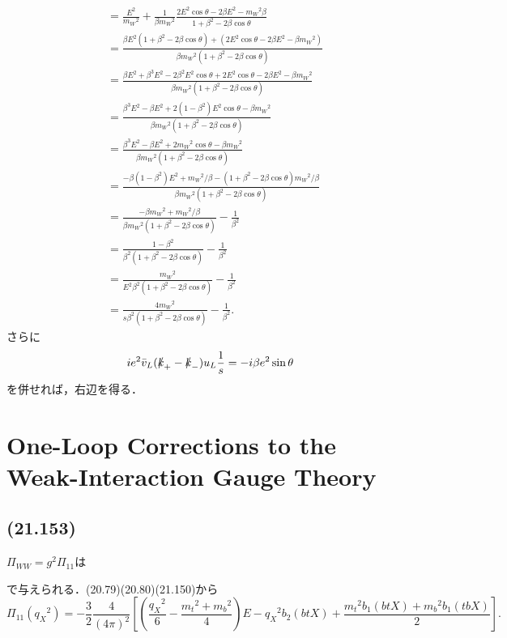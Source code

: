 \begin{align*}
  [\cdots] &= \frac{E^2}{m_W{}^2} + \frac{1}{\beta m_W{}^2} \frac{2 E^2 \cos\theta - 2 \beta E^2  - m_W{}^2 \beta}{1 + \beta^2 - 2\beta\cos\theta} \\
  &= \frac{\beta E^2(1 + \beta^2 - 2\beta\cos\theta) + (2E^2\cos\theta - 2\beta E^2 - \beta m_W{}^2)}{\beta m_W{}^2 (1 + \beta^2 - 2\beta\cos\theta)} \\
  &= \frac{\beta E^2 + \beta^3 E^2 - 2\beta^2E^2\cos\theta + 2E^2\cos\theta - 2\beta E^2 - \beta m_W{}^2}{\beta m_W{}^2 (1 + \beta^2 - 2\beta\cos\theta)} \\
  &= \frac{\beta^3 E^2 - \beta E^2  + 2(1-\beta^2)E^2\cos\theta - \beta m_W{}^2}{\beta m_W{}^2 (1 + \beta^2 - 2\beta\cos\theta)} \\
  &= \frac{\beta^3 E^2 - \beta E^2 + 2m_W{}^2\cos\theta - \beta m_W{}^2}{\beta m_W{}^2 (1 + \beta^2 - 2\beta\cos\theta)} \\
  &= \frac{-\beta(1-\beta^2) E^2 + m_W{}^2 / \beta - (1 + \beta^2 - 2\beta\cos\theta) m_W{}^2/\beta}{\beta m_W{}^2 (1 + \beta^2 - 2\beta\cos\theta)} \\
  &= \frac{-\beta m_W{}^2 + m_W{}^2/\beta}{\beta m_W{}^2 (1 + \beta^2 - 2\beta\cos\theta)} - \frac{1}{\beta^2} \\
  &= \frac{1 - \beta^2}{\beta^2 (1 + \beta^2 - 2\beta\cos\theta)} - \frac{1}{\beta^2} \\
  &= \frac{m_W{}^2}{E^2\beta^2 (1 + \beta^2 - 2\beta\cos\theta)} - \frac{1}{\beta^2} \\
  &= \frac{4m_W{}^2}{s\beta^2 (1 + \beta^2 - 2\beta\cos\theta)} - \frac{1}{\beta^2} .
\end{align*}
さらに
\[ ie^2 \bar{v}_L (\slashed{k}_+-\slashed{k}_-) u_L \frac{1}{s} = - i\beta e^2 \sin\theta \]
を併せれば，右辺を得る．

\section{One-Loop Corrections to the Weak-Interaction Gauge Theory}
\subsection{(21.153)}
$\Pi_{WW} = g^2 \Pi_{11}$は
\begin{center}
\end{center}
で与えられる．(20.79)(20.80)(21.150)から
\[
\Pi_{11}(q_X{}^2) = - \frac{3}{2} \frac{4}{(4\pi)^2}
\left[\left(\frac{q_X{}^2}{6} - \frac{m_t{}^2+m_b{}^2}{4} \right) E - q_X{}^2 b_2(btX)
+ \frac{m_t{}^2b_1(btX)+m_b{}^2b_1(tbX)}{2} \right] .
\]

